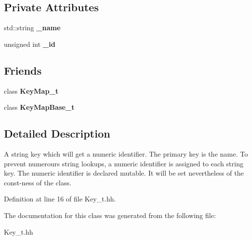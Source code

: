 \subsection*{Private Attributes}
\begin{DoxyCompactItemize}
\item 
std::string {\bfseries \_\-name}\label{classhistmgr_1_1Key__t_a3ef2f7aa7639d24c9c94389a7e08cc52}

\item 
unsigned int {\bfseries \_\-id}\label{classhistmgr_1_1Key__t_a6bd85027f8ed355208f46dbbfbc314df}

\end{DoxyCompactItemize}
\subsection*{Friends}
\begin{DoxyCompactItemize}
\item 
class {\bfseries KeyMap\_\-t}\label{classhistmgr_1_1Key__t_a2801f1de643e34fefd4a7828ed4dcbe4}

\item 
class {\bfseries KeyMapBase\_\-t}\label{classhistmgr_1_1Key__t_a9575e83b8b317dbc46a599683d98e086}

\end{DoxyCompactItemize}


\subsection{Detailed Description}
A string key which will get a numeric identifier. The primary key is the name. To prevent numerours string lookups, a numeric identifier is assigned to each string key. The numeric identifier is declared mutable. It will be set nevertheless of the const-\/ness of the class. 

Definition at line 16 of file Key\_\-t.hh.

The documentation for this class was generated from the following file:\begin{DoxyCompactItemize}
\item 
Key\_\-t.hh\end{DoxyCompactItemize}
